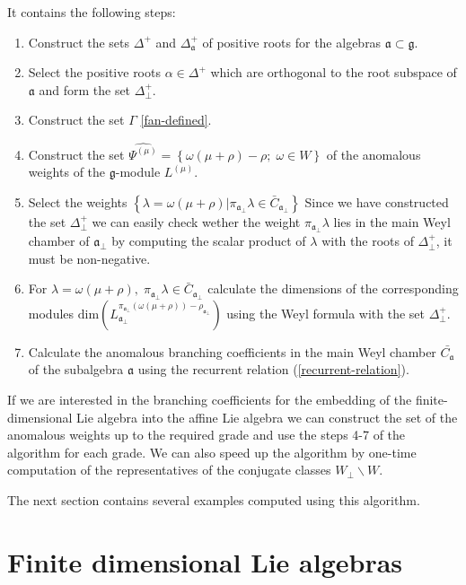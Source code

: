 \documentclass[a4paper,12pt]{article}
\theoremstyle{definition} \newtheorem{Def}{Definition}
\begin{document}
It contains the following steps:
\begin{enumerate}
\item Construct the sets $\Delta^{+}$ and $\Delta_{\mathfrak{a}}^{+}$ of positive roots for the algebras $\mathfrak{a} \subset \mathfrak{g}$.
\item Select the positive roots $\alpha\in \Delta^{+}$ which are orthogonal to the root subspace of $\mathfrak{a}$ and form the set $\Delta^{+}_{\bot}$.
\item Construct the set $\Gamma$ \eqref{fan-defined}.
\item Construct the set $\widehat{\Psi^{(\mu)}}=\left\{\omega(\mu+\rho)-\rho;\; \omega\in W\right\}$ of the anomalous weights of the $\mathfrak{g}$-module $L^{(\mu)}$.
\item Select the weights $\left\{ \lambda=\omega(\mu+\rho) | \pi_{\mathfrak{a}_{\bot}}\lambda \in \bar{C}_{\mathfrak{a}_{\bot}} \right\}$ Since we have constructed the set $\Delta^{+}_{\bot}$ we can easily check wether the weight $\pi_{\mathfrak{a}_{\bot}}\lambda$ lies in the main Weyl chamber of $\mathfrak{a}_{\bot}$ by computing the scalar product of $\lambda$ with the roots of $\Delta^{+}_{\bot}$, it must be non-negative.
\item For $\lambda=\omega(\mu+\rho),\; \pi_{\mathfrak{a}_{\bot}}\lambda\in \bar{C}_{\mathfrak{a}_{\bot}}$ calculate the dimensions of the corresponding modules $\mathrm{dim}\left(L^{\pi_{\mathfrak{a}_{\bot}}(\omega(\mu+\rho))-\rho_{\mathfrak{a}_{\bot}}}_{\mathfrak{a}_{\bot}}\right)$ using the Weyl formula with the set $\Delta^{+}_{\bot}$.
\item Calculate the anomalous branching coefficients in the main Weyl
  chamber $\bar{C_{\mathfrak{a}}}$ of the subalgebra $\mathfrak{a}$ using the recurrent relation (\ref{recurrent-relation}).
\end{enumerate}

If we are interested in the branching coefficients for the embedding of the finite-dimensional Lie algebra into the affine Lie algebra we can construct the set of the anomalous weights up to the required grade and use the steps 4-7 of the algorithm for each grade. We can also speed up the algorithm by one-time computation of the representatives of the conjugate classes $W_{\bot}\backslash W$.

The next section contains several examples computed using this algorithm.

\section{Finite dimensional Lie algebras}
\label{sec:finite-dimens-lie}
\end{document}
